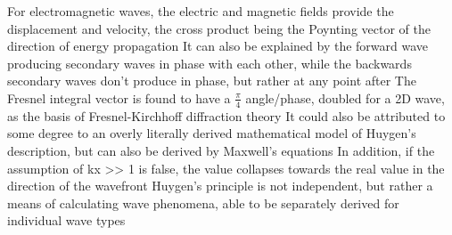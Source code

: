 \documentclass[11 pt, twoside]{article}
\newenvironment{outline*}
{
	\begin{outline}[enumerate]
	}
	{\end{outline}
}
\begin{document}
\begin{outline*}
\4 For electromagnetic waves, the electric and magnetic fields provide the displacement and velocity, the cross product being the Poynting vector of the direction of energy propagation
\4 It can also be explained by the forward wave producing secondary waves in phase with each other, while the backwards secondary waves don't produce in phase, but rather at any point after
\3 The Fresnel integral vector is found to have a $\frac{\pi}{4}$ angle/phase, doubled for a 2D wave, as the basis of Fresnel-Kirchhoff diffraction theory
\4 It could also be attributed to some degree to an overly literally derived mathematical model of Huygen's description, but can also be derived by Maxwell's equations
\4 In addition, if the assumption of kx >> 1 is false, the value collapses towards the real value in the direction of the wavefront
\1 Huygen's principle is not independent, but rather a means of calculating wave phenomena, able to be separately derived for individual wave types
\end{outline*}
\end{document}
